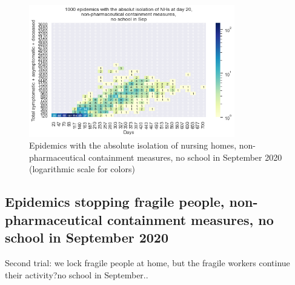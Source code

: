 \documentclass[11pt]{article}
\begin{document}
\begin{figure}[H]
\begin{center}
\includegraphics[width=0.8\textwidth]{HM30_readRunResults1k_with_NH_OP_BZ_at20_plusHMlog.png}
\caption{Epidemics with the absolute isolation of nursing homes, non-pharmaceutical containment measures, no school in September 2020 (logarithmic scale for colors)}
\label{EpidemicsNHsHM}
\end{center}
\end{figure}


\subsection{Epidemics stopping fragile people, non-pharmaceutical containment measures, no school in September 2020}
\label{EpidemicsFragileS}


Second trial: we lock fragile people at home, but the fragile workers continue their activity?no school in September..
\end{document}
